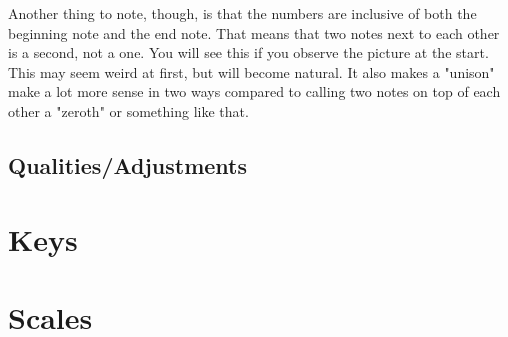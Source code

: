 \documentclass[../OpenAppliedMusicTheory.tex]{subfiles}
\begin{document}
    Another thing to note, though, is that the numbers are inclusive of both the beginning note and the end note. That means that two notes next to each other is a second, not a one. You will see this if you observe the picture at the start. This may seem weird at first, but will become natural. It also makes a "unison" make a lot more sense in two ways compared to calling two notes on top of each other a "zeroth" or something like that.

    \subsection{Qualities/Adjustments}
    
    \section{Keys}\label{ch3:keys}

    \section{Scales}\label{ch3:scales}
\end{document}
